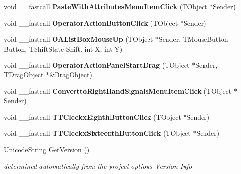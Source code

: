 \begin{DoxyCompactItemize}
\item 
\mbox{\label{class_t_interface_a4732a8c5f1ccf8425bcc713969ed64a7}} 
void \+\_\+\+\_\+fastcall {\bfseries Paste\+With\+Attributes\+Menu\+Item\+Click} (T\+Object $\ast$Sender)
\item 
\mbox{\label{class_t_interface_a6ab8ece23e5d3fca1da26e2360e349ec}} 
void \+\_\+\+\_\+fastcall {\bfseries Operator\+Action\+Button\+Click} (T\+Object $\ast$Sender)
\item 
\mbox{\label{class_t_interface_a54c8faaf7d1d8f0456114676fd20a17f}} 
void \+\_\+\+\_\+fastcall {\bfseries O\+A\+List\+Box\+Mouse\+Up} (T\+Object $\ast$Sender, T\+Mouse\+Button Button, T\+Shift\+State Shift, int X, int Y)
\item 
\mbox{\label{class_t_interface_a659a63c1342a6d5ebd23422a608d140f}} 
void \+\_\+\+\_\+fastcall {\bfseries Operator\+Action\+Panel\+Start\+Drag} (T\+Object $\ast$Sender, T\+Drag\+Object $\ast$\&Drag\+Object)
\item 
\mbox{\label{class_t_interface_ad9449a5d1fa3eada816b8b66500d7d44}} 
void \+\_\+\+\_\+fastcall {\bfseries Convertto\+Right\+Hand\+Signals\+Menu\+Item\+Click} (T\+Object $\ast$Sender)
\item 
\mbox{\label{class_t_interface_a88560ffaa54dae104844cba0d2570459}} 
void \+\_\+\+\_\+fastcall {\bfseries T\+T\+Clockx\+Eighth\+Button\+Click} (T\+Object $\ast$Sender)
\item 
\mbox{\label{class_t_interface_ae72820fb38dc4605912e274bfd0801cc}} 
void \+\_\+\+\_\+fastcall {\bfseries T\+T\+Clockx\+Sixteenth\+Button\+Click} (T\+Object $\ast$Sender)
\item 
\mbox{\label{class_t_interface_aa09ce755ae1d39671b9b358f86d83fde}} 
Unicode\+String \mbox{\hyperlink{class_t_interface_aa09ce755ae1d39671b9b358f86d83fde}{Get\+Version}} ()
\begin{DoxyCompactList}\small\item\em determined automatically from the project options \textquotesingle{}Version Info\textquotesingle{} \end{DoxyCompactList}\end{DoxyCompactItemize}
